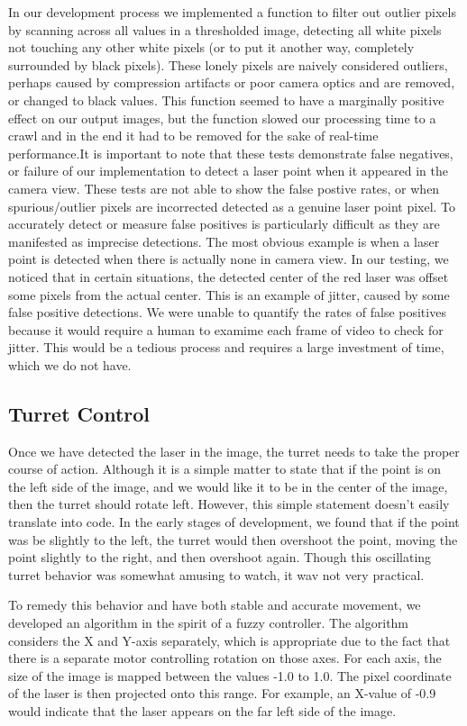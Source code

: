 \documentclass[10pt,twocolumn,letterpaper]{article}
\begin{document}
In our development process we implemented a function to filter out outlier pixels by scanning across all values in a thresholded image, detecting all white pixels not touching any other white pixels (or to put it another way, completely surrounded by black pixels).  These lonely pixels are naively considered outliers, perhaps caused by compression artifacts or poor camera optics and are removed, or changed to black values.  This function seemed to have a marginally positive effect on our output images, but the function slowed our processing time to a crawl and in the end it had to be removed for the sake of real-time performance.It is important to note that these tests demonstrate false negatives, or failure of our implementation to detect a laser point when it appeared in the camera view.  These tests are not able to show the false postive rates, or when spurious/outlier pixels are incorrected detected as a genuine laser point pixel.  To accurately detect or measure false positives is particularly difficult as they are manifested as imprecise detections.  The most obvious example is when a laser point is detected when there is actually none in camera view.  In our testing, we noticed that in certain situations, the detected center of the red laser was offset some pixels from the actual center.  This is an example of jitter, caused by some false positive detections.  We were unable to quantify the rates of false positives because it would require a human to examime each frame of video to check for jitter.  This would be a tedious process and requires a large investment of time, which we do not have.

\subsection{Turret Control}

Once we have detected the laser in the image, the turret needs to take the proper course of action. Although it is a  simple matter to state that if the point is on the left side of the image, and we would like it to be in the center of the image, then the turret should rotate left. However, this simple statement doesn't easily translate into code.  In the early stages of development, we found that if the point was be slightly to the left, the turret would then overshoot the point, moving the point slightly to the right, and then overshoot again. Though this oscillating turret behavior was somewhat amusing to watch, it wav not very practical.

To remedy this behavior and have both stable and accurate movement, we developed an algorithm in the spirit of a fuzzy controller. The algorithm considers the X and Y-axis separately, which is appropriate due to the fact that there is a separate motor controlling rotation on those axes. For each axis, the size of the image is mapped between the values -1.0 to 1.0. The pixel coordinate of the laser is then projected onto this range. For example, an X-value of -0.9 would indicate that the laser appears on the far left side of the image.
\end{document}
